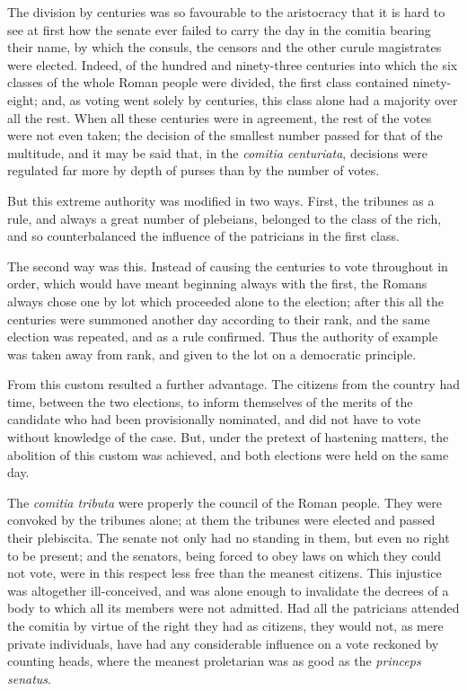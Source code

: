 \documentclass[12pt]{book}
\begin{document}
The division by centuries was so favourable to the aristocracy that it is hard to see at first how the senate ever failed to carry the day in the comitia bearing their name, by which the consuls, the censors and the other curule magistrates were elected. Indeed, of the hundred and ninety-three centuries into which the six classes of the whole Roman people were divided, the first class contained ninety-eight; and, as voting went solely by centuries, this class alone had a majority over all the rest. When all these centuries were in agreement, the rest of the votes were not even taken; the decision of the smallest number passed for that of the multitude, and it may be said that, in the \textit{comitia centuriata}, decisions were regulated far more by depth of purses than by the number of votes.

But this extreme authority was modified in two ways. First, the tribunes as a rule, and always a great number of plebeians, belonged to the class of the rich, and so counterbalanced the influence of the patricians in the first class.

The second way was this. Instead of causing the centuries to vote throughout in order, which would have meant beginning always with the first, the Romans always chose one by lot which proceeded alone to the election; after this all the centuries were summoned another day according to their rank, and the same election was repeated, and as a rule confirmed. Thus the authority of example was taken away from rank, and given to the lot on a democratic principle.

From this custom resulted a further advantage. The citizens from the country had time, between the two elections, to inform themselves of the merits of the candidate who had been provisionally nominated, and did not have to vote without knowledge of the case. But, under the pretext of hastening matters, the abolition of this custom was achieved, and both elections were held on the same day.

The \textit{comitia tributa} were properly the council of the Roman people. They were convoked by the tribunes alone; at them the tribunes were elected and passed their plebiscita. The senate not only had no standing in them, but even no right to be present; and the senators, being forced to obey laws on which they could not vote, were in this respect less free than the meanest citizens. This injustice was altogether ill-conceived, and was alone enough to invalidate the decrees of a body to which all its members were not admitted. Had all the patricians attended the comitia by virtue of the right they had as citizens, they would not, as mere private individuals, have had any considerable influence on a vote reckoned by counting heads, where the meanest proletarian was as good as the \textit{princeps senatus}.
\end{document}
